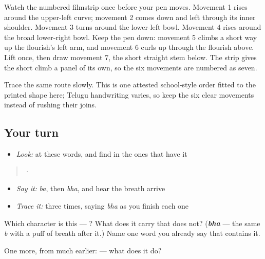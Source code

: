 Watch the numbered filmstrip once before your pen moves. Movement 1 rises around the upper-left curve; movement 2 comes down and left through its inner shoulder. Movement 3 turns around the lower-left bowl. Movement 4 rises around the broad lower-right bowl. Keep the pen down: movement 5 climbs a short way up the flourish's left arm, and movement 6 curls up through the flourish above. Lift once, then draw movement 7, the short straight stem below. The strip gives the short climb a panel of its own, so the six movements are numbered as seven.

Trace the same route slowly. This is one attested school-style order fitted to the printed shape here; Telugu handwriting varies, so keep the six clear movements instead of rushing their joins.

\subsection*{Your turn}
\begin{itemize}
\raggedright
  \item \emph{Look:} at these words, and find  in the ones that have it
\end{itemize}

\begin{quote}
   ·  
\end{quote}

\begin{itemize}
\raggedright
  \item \emph{Say it:} \emph{ba}, then \emph{bha}, and hear the breath arrive
  \item \emph{Trace it:}  three times, saying \emph{bha} as you finish each one
\end{itemize}

\begin{tcolorbox}[breakable,colback=teal!4,colframe=teal!35!black,title={Before you move on}]
Which character is this — ? What does it carry that  does not? (\emph{\textbf{bha}} — the same \emph{b} with a puff of breath after it.) Name one word you already say that contains it.

One more, from much earlier:  — what does it do?
\end{tcolorbox}
